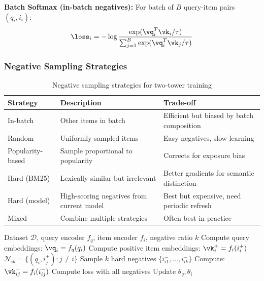 \textbf{Batch Softmax (in-batch negatives):}
For batch of $B$ query-item pairs $(q_i, i_i)$:
\begin{equation}
\loss_i = -\log \frac{\exp(\vq_i^T \vk_i / \tau)}{\sum_{j=1}^{B} \exp(\vq_i^T \vk_j / \tau)}
\end{equation}

\subsubsection{Negative Sampling Strategies}

\begin{table}[H]
\centering
\caption{Negative sampling strategies for two-tower training}
\begin{tabularx}{\textwidth}{lXX}
\toprule
\textbf{Strategy} & \textbf{Description} & \textbf{Trade-off} \\
\midrule
In-batch & Other items in batch & Efficient but biased by batch composition \\
Random & Uniformly sampled items & Easy negatives, slow learning \\
Popularity-based & Sample proportional to popularity & Corrects for exposure bias \\
Hard (BM25) & Lexically similar but irrelevant & Better gradients for semantic distinction \\
Hard (model) & High-scoring negatives from current model & Best but expensive, need periodic refresh \\
Mixed & Combine multiple strategies & Often best in practice \\
\bottomrule
\end{tabularx}
\end{table}

\begin{algorithm}[H]
\caption{Two-Tower Training with Mixed Negatives}
\begin{algorithmic}[1]
\REQUIRE Dataset $\mathcal{D}$, query encoder $f_q$, item encoder $f_i$, negative ratio $k$
    \STATE Compute query embeddings: $\vq_i = f_q(q_i)$
    \STATE Compute positive item embeddings: $\vk_i^+ = f_i(i_i^+)$
    \STATE {}
    \STATE $\mathcal{N}_{ib} = \{(q_i, i_j^+) : j \neq i\}$
    \STATE {}
        \STATE Sample $k$ hard negatives $\{i_{i1}^-, \ldots, i_{ik}^-\}$
        \STATE Compute: $\vk_{ij}^- = f_i(i_{ij}^-)$
    \ENDFOR
    \STATE Compute loss with all negatives
    \STATE Update $\theta_q, \theta_i$
\ENDFOR
\end{algorithmic}
\end{algorithm}

